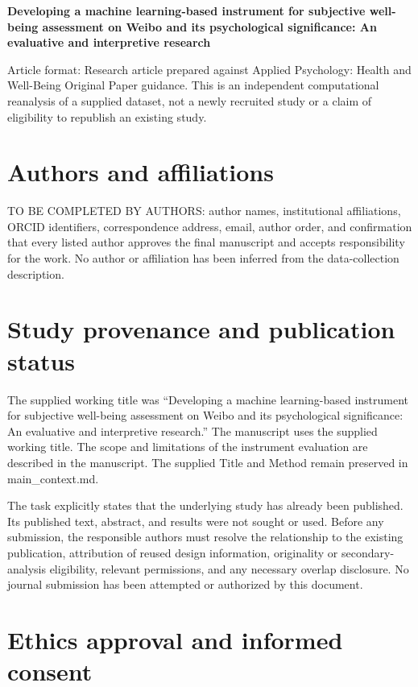 \documentclass[11pt,letterpaper]{article}
\begin{document}
\begin{center}\fontsize{16}{20}\selectfont\bfseries Developing a machine learning-based instrument for subjective well-being assessment on Weibo and its psychological significance: An evaluative and interpretive research\end{center}
Article format: Research article prepared against Applied Psychology: Health and Well-Being Original Paper guidance. This is an independent computational reanalysis of a supplied dataset, not a newly recruited study or a claim of eligibility to republish an existing study.

\section{Authors and affiliations}\label{authors-and-affiliations}

TO BE COMPLETED BY AUTHORS: author names, institutional affiliations, ORCID identifiers, correspondence address, email, author order, and confirmation that every listed author approves the final manuscript and accepts responsibility for the work. No author or affiliation has been inferred from the data-collection description.

\section{Study provenance and publication status}\label{study-provenance-and-publication-status}

The supplied working title was ``Developing a machine learning-based instrument for subjective well-being assessment on Weibo and its psychological significance: An evaluative and interpretive research.'' The manuscript uses the supplied working title. The scope and limitations of the instrument evaluation are described in the manuscript. The supplied Title and Method remain preserved in main\_\allowbreak{}context.md.

The task explicitly states that the underlying study has already been published. Its published text, abstract, and results were not sought or used. Before any submission, the responsible authors must resolve the relationship to the existing publication, attribution of reused design information, originality or secondary-analysis eligibility, relevant permissions, and any necessary overlap disclosure. No journal submission has been attempted or authorized by this document.

\section{Ethics approval and informed consent}\label{ethics-approval-and-informed-consent}
\end{document}
